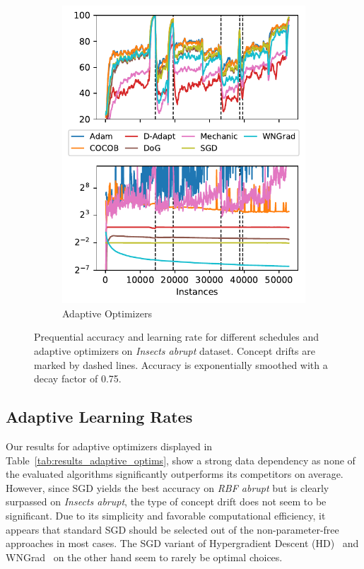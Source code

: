 \documentclass{article} %
\begin{document}
\begin{figure}[ht]
\begin{subfigure}[b]{0.99\textwidth - \asize}
      \includegraphics[width=\textwidth]{figures/lr_norms_optims_insects_abrupt.pdf}
      \caption{Adaptive Optimizers}
      \label{fig:prequential_optims_insects}
   \end{subfigure}
   \caption{Prequential accuracy and learning rate for different schedules and adaptive optimizers on \textit{Insects abrupt} dataset. Concept drifts are marked by dashed lines. Accuracy is exponentially smoothed with a decay factor of 0.75.}
\end{figure}

\subsection{Adaptive Learning Rates}

Our results for adaptive optimizers displayed in Table~\ref{tab:results_adaptive_optims}, show a strong data dependency as none of the evaluated algorithms significantly outperforms its competitors on average.
However, since SGD yields the best accuracy on \textit{RBF abrupt} but is clearly surpassed on \textit{Insects abrupt}, the type of concept drift does not seem to be significant.
Due to its simplicity and favorable computational efficiency, it appears that standard SGD should be selected out of the non-parameter-free approaches in most cases.
The SGD variant of Hypergradient Descent (HD)~\citep{baydinOnlineLearningRate2018} and WNGrad~\citep{wuWNGradLearnLearning2020} on the other hand seem to rarely be optimal choices.
\end{document}
